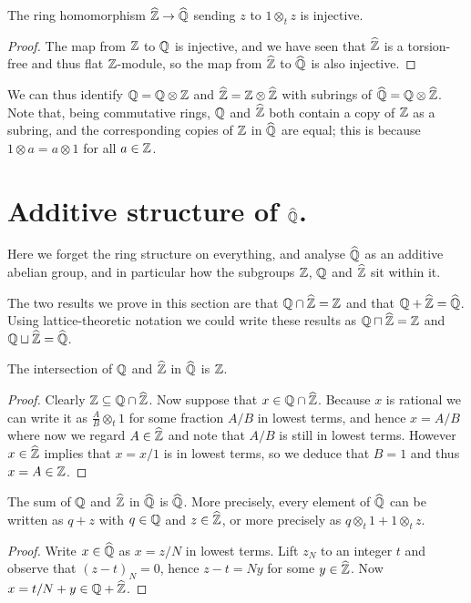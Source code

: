 \begin{lemma}
    \label{QHat.injective_zHat}
    \leanok
    The ring homomorphism $\widehat{\mathbb{Z}}\to\widehat{\mathbb{Q}}$ sending
    $z$ to $1\otimes_t z$ is injective.
\end{lemma}
\begin{proof}
    The map from $\mathbb{Z}$ to $\mathbb{Q}$ is injective, and we have seen
    that $\widehat{\mathbb{Z}}$ is a torsion-free and thus flat $\mathbb{Z}$-module,
    so the map from $\widehat{\mathbb{Z}}$ to $\widehat{\mathbb{Q}}$ is also injective.
\end{proof}

We can thus identify $\mathbb{Q}=\mathbb{Q}\otimes\mathbb{Z}$ and $\widehat{\mathbb{Z}}=\mathbb{Z}\otimes\widehat{\mathbb{Z}}$ with subrings of $\widehat{\mathbb{Q}}=\mathbb{Q}\otimes\widehat{\mathbb{Z}}$.
Note that, being commutative rings, $\mathbb{Q}$ and $\widehat{\mathbb{Z}}$ both contain a copy of $\mathbb{Z}$ as a subring, and
the corresponding copies of $\mathbb{Z}$ in $\widehat{\mathbb{Q}}$ are equal; this is because $1\otimes a=a\otimes 1$
for all $a\in\mathbb{Z}$.

\section{Additive structure of \texorpdfstring{$\widehat{\mathbb{Q}}$}{Qhat}.}

Here we forget the ring structure on everything, and analyse $\widehat{\mathbb{Q}}$ as an additive
abelian group, and in particular how the subgroups $\mathbb{Z}$, $\mathbb{Q}$ and $\widehat{\mathbb{Z}}$ sit within it.

The two results we prove in this section are that $\mathbb{Q}\cap\widehat{\mathbb{Z}}=\mathbb{Z}$ and
that $\mathbb{Q}+\widehat{\mathbb{Z}}=\widehat{\mathbb{Q}}$. Using lattice-theoretic notation we could write
these results as $\mathbb{Q}\sqcap\widehat{\mathbb{Z}}=\mathbb{Z}$ and $\mathbb{Q}\sqcup\widehat{\mathbb{Z}}=\widehat{\mathbb{Q}}$.

\begin{lemma}
    \label{Qhat.rat_meet_zHat}
    \leanok
    The intersection of $\mathbb{Q}$ and $\widehat{\mathbb{Z}}$ in $\widehat{\mathbb{Q}}$ is $\mathbb{Z}$.
\end{lemma}
\begin{proof}
    Clearly $\mathbb{Z}\subseteq\mathbb{Q}\cap\widehat{\mathbb{Z}}$. Now suppose that $x\in\mathbb{Q}\cap\widehat{\mathbb{Z}}$.
    Because $x$ is rational we can write it as $\frac{A}{B}\otimes_t1$ for some
    fraction $A/B$ in lowest terms, and hence $x=A/B$ where now we regard $A\in\widehat{\mathbb{Z}}$
    and note that $A/B$ is still in lowest terms. However $x\in\widehat{\mathbb{Z}}$ implies that
    $x=x/1$ is in lowest terms, so we deduce that $B=1$ and thus $x=A\in\mathbb{Z}$.
\end{proof}

\begin{lemma}
    \label{QHat.rat_join_zHat}
    \leanok
    The sum of $\mathbb{Q}$ and $\widehat{\mathbb{Z}}$ in $\widehat{\mathbb{Q}}$ is $\widehat{\mathbb{Q}}$.
    More precisely, every element of $\widehat{\mathbb{Q}}$ can be written as $q+z$ with $q\in\mathbb{Q}$ and $z\in\widehat{\mathbb{Z}}$,
    or more precisely as $q\otimes_t 1+1\otimes_t z$.
\end{lemma}
\begin{proof}
    Write $x\in\widehat{\mathbb{Q}}$ as $x=z/N$ in lowest terms. Lift $z_N$ to an integer $t$ and observe
    that $(z-t)_N=0$, hence $z-t=Ny$ for some $y\in\widehat{\mathbb{Z}}$. Now $x=t/N+y\in\mathbb{Q}+\widehat{\mathbb{Z}}$.
\end{proof}

